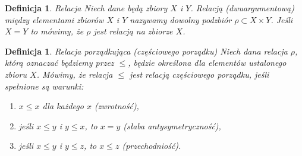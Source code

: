 \documentclass[12pt,a4paper]{report}
\newtheorem{definition}[theorem]{Definicja}
\begin{document}

\begin{definition}{Relacja \cite[Rozdział 3]{kuratowski2004}}
Niech dane będą zbiory $X$ i $Y$. Relacją (dwuargumentową) między elementami zbiorów $X$ i $Y$ nazywamy dowolny podzbiór $\rho \subset X \times Y $. Jeśli $X=Y$ to mówimy, że $\rho$ jest relacją na zbiorze $X$. 
\end{definition} 


\begin{definition}{Relacja porządkująca (częściowego porządku) \cite[Rozdział 2]{blaszczyk2007}}\label{def-relacja-czesciowego-porzadku}
Niech dana relacja $\rho$, którą oznaczać będziemy przez $\leq$, będzie określona dla elementów ustalonego zbioru $X$. Mówimy, że relacja $\leq$ jest relacją częściowego porządku, jeśli spełnione są warunki:
\begin{enumerate}
\item $x \leq x$ dla każdego $x$ (zwrotność),
\item jeśli $x \leq y$ i $y \leq x$, to $x=y$ (słaba antysymetryczność),
\item jeśli $x \leq y$ i $y \leq z$, to $x \leq z$ (przechodniość).
\end{enumerate}
\end{definition}
\end{document}
